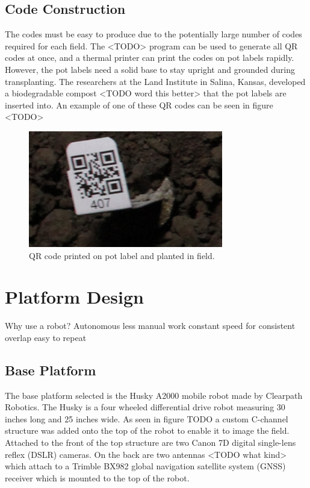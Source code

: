 \subsection{Code Construction}

The codes must be easy to produce due to the potentially large number of codes required for each field.  The <TODO> program can be used to generate all QR codes at once, and a thermal printer can print the codes on pot labels rapidly.  However, the pot labels need a solid base to stay upright and grounded during transplanting. The researchers at the Land Institute in Salina, Kansas, developed a biodegradable compost <TODO word this better> that the pot labels are inserted into.  An example of one of these QR codes can be seen in figure <TODO> 

\begin{figure}[htb]
	\centering
    \includegraphics[height=2in]{figures/qr_code_407.png}
    \caption[QR code]{QR code printed on pot label and planted in field.}
    \label{QR code}
\end{figure}

\section{Platform Design}
\label{system-platform}

Why use a robot?
Autonomous
less manual work 
constant speed for consistent overlap
easy to repeat

\subsection{Base Platform}

The base platform selected is the Husky A2000 mobile robot made by Clearpath Robotics.  The Husky is a four wheeled differential drive robot measuring 30 inches long and 25 inches wide.  As seen in figure TODO a custom C-channel structure was added onto the top of the robot to enable it to image the field.  Attached to the front of the top structure are two Canon 7D digital single-lens reflex (DSLR) cameras. On the back are two antennas <TODO what kind> which attach to a Trimble BX982 global navigation satellite system (GNSS) receiver which is mounted to the top of the robot.   

